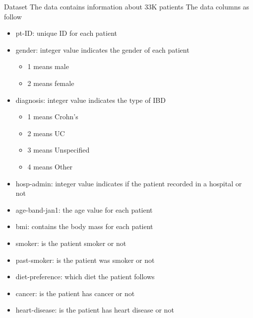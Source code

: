 \documentclass[8pt]{beamer}
\begin{document}
        \begin{frame}{Dataset}
            The data contains information about 33K patients The data columns as follow
            \begin{itemize}
                \item pt-ID: unique ID for each patient
                \item gender: integer value indicates the gender of each patient
                    \begin{itemize}
                        \item 1 means male
                        \item 2 means female
                    \end{itemize} 
                \item diagnosis: integer value indicates the type of IBD
                    \begin{itemize}
                        \item 1 means Crohn's
                        \item 2 means UC
                        \item 3 means Unspecified
                        \item 4 means Other
                    \end{itemize}
                \item hosp-admin: integer value indicates if the patient recorded in a hospital or not
                \item age-band-jan1: the age value for each patient
                \item bmi: contains the body mass for each patient
                \item smoker: is the patient smoker or not
                \item past-smoker: is the patient was smoker or not
                \item diet-preference: which diet the patient follows
                \item cancer: is the patient has cancer or not
                \item heart-disease: is the patient has heart disease or not
            \end{itemize}
        \end{frame}
\end{document}

